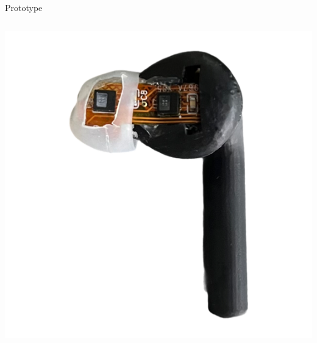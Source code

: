 \documentclass[en]{sdqbeamer}
\begin{document}
\begin{frame}{Prototype}
\begin{columns}[T]
    \begin{column}{.31\textwidth} %
      \includegraphics[width=0.9\linewidth]{../thesis-doc/images/prototype/Earpod_Side2.png} %
    \end{column}
  \end{columns}
\end{frame}

\end{document}
